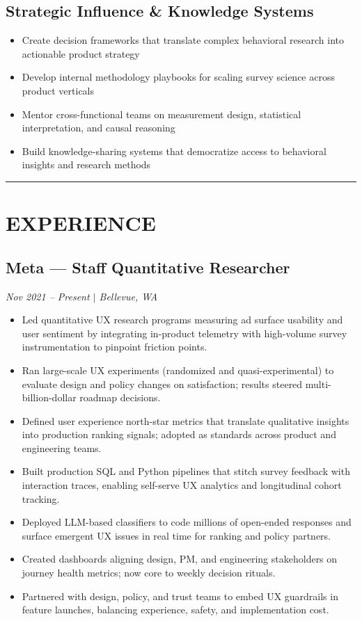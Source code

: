 \documentclass[11pt,a4paper]{article}
\newcommand{\sepline}{\noindent\rule{\textwidth}{0.5pt}\vspace{0.5em}}
\begin{document}
\subsection*{Strategic Influence \& Knowledge Systems}
\begin{itemize}
    \item Create decision frameworks that translate complex behavioral research into actionable product strategy
    \item Develop internal methodology playbooks for scaling survey science across product verticals
    \item Mentor cross-functional teams on measurement design, statistical interpretation, and causal reasoning
    \item Build knowledge-sharing systems that democratize access to behavioral insights and research methods
\end{itemize}

\vspace{0.5em}
\sepline

\section*{EXPERIENCE}

\subsection*{Meta --- Staff Quantitative Researcher}
\textit{Nov 2021 -- Present $\mid$ Bellevue, WA}
\begin{itemize}
    \item Led quantitative UX research programs measuring ad surface usability and user sentiment by integrating in-product telemetry with high-volume survey instrumentation to pinpoint friction points.
    \item Ran large-scale UX experiments (randomized and quasi-experimental) to evaluate design and policy changes on satisfaction; results steered multi-billion-dollar roadmap decisions.
    \item Defined user experience north-star metrics that translate qualitative insights into production ranking signals; adopted as standards across product and engineering teams.
    \item Built production SQL and Python pipelines that stitch survey feedback with interaction traces, enabling self-serve UX analytics and longitudinal cohort tracking.
    \item Deployed LLM-based classifiers to code millions of open-ended responses and surface emergent UX issues in real time for ranking and policy partners.
    \item Created dashboards aligning design, PM, and engineering stakeholders on journey health metrics; now core to weekly decision rituals.
    \item Partnered with design, policy, and trust teams to embed UX guardrails in feature launches, balancing experience, safety, and implementation cost.
\end{itemize}
\end{document}
